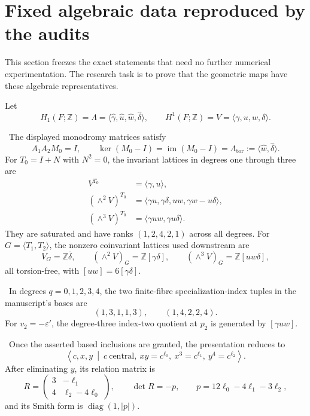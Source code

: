 \section{Fixed algebraic data reproduced by the audits}

This section freezes the exact statements that need no further numerical experimentation. The research task is to prove that the geometric maps have these algebraic representatives.

Let
\[
H_1(F;\mathbb Z)=\Lambda
=\langle\widehat\gamma,\widehat u,\widehat w,\widehat\delta\rangle,
\qquad
H^1(F;\mathbb Z)=V
=\langle\gamma,u,w,\delta\rangle.
\]

\begin{proposition}
\Verified\ The displayed monodromy matrices satisfy
\[
A_1A_2M_0=I,
\qquad
\ker(M_0-I)=\operatorname{im}(M_0-I)
=\Lambda_{\mathrm{tor}}:=\langle\widehat w,\widehat\delta\rangle.
\]
For $T_0=I+N$ with $N^2=0$, the invariant lattices in degrees one through three are
\begin{align*}
V^{T_0}&=\langle\gamma,u\rangle,\\
(\wedge^2V)^{T_0}
&=\langle\gamma u,\gamma\delta,uw,\gamma w-u\delta\rangle,\\
(\wedge^3V)^{T_0}
&=\langle\gamma uw,\gamma u\delta\rangle.
\end{align*}
They are saturated and have ranks $(1,2,4,2,1)$ across all degrees. For $G=\langle T_1,T_2\rangle$, the nonzero coinvariant lattices used downstream are
\[
V_G=\mathbb Z\bar\delta,\qquad
(\wedge^2V)_G=\mathbb Z[\gamma\delta],\qquad
(\wedge^3V)_G=\mathbb Z[uw\delta],
\]
all torsion-free, with $[uw]=6[\gamma\delta]$.
\end{proposition}

\begin{proposition}
\Verified\ In degrees $q=0,1,2,3,4$, the two finite-fibre
specialization-index tuples in the manuscript's bases are
\[
(1,3,1,1,3),\qquad (1,4,2,2,4).
\]
For $v_2=-\varepsilon'$, the degree-three index-two quotient at $p_2$ is generated by $[\gamma uw]$.
\end{proposition}

\begin{proposition}
\Verified\ Once the asserted based inclusions are granted, the presentation reduces to
\[
\left\langle c,x,y\ \middle|\ c\ \text{central},\ xy=c^{\ell_0},\
x^3=c^{\ell_1},\ y^4=c^{\ell_2}\right\rangle.
\]
After eliminating $y$, its relation matrix is
\[
R=\begin{pmatrix}3&-\ell_1\\4&\ell_2-4\ell_0\end{pmatrix},
\qquad
\det R=-p,
\qquad
p=12\ell_0-4\ell_1-3\ell_2,
\]
and its Smith form is $\operatorname{diag}(1,|p|)$.
\end{proposition}

